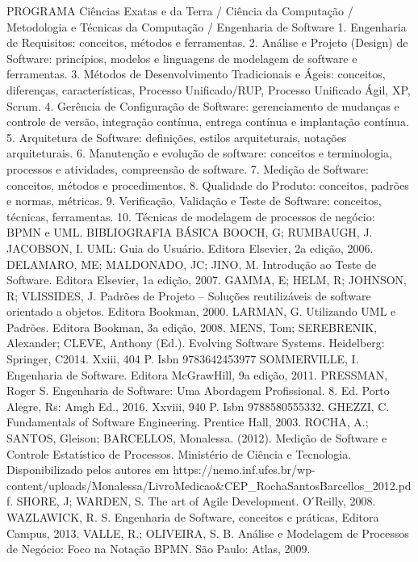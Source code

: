 
PROGRAMA
Ciências Exatas e da Terra / Ciência da Computação / Metodologia e Técnicas da Computação / Engenharia de Software
1. Engenharia de Requisitos: conceitos, métodos e ferramentas.
2. Análise e Projeto (Design) de Software: princípios, modelos e linguagens de modelagem de software e ferramentas.
3. Métodos de Desenvolvimento Tradicionais e Ágeis: conceitos, diferenças, características, Processo Unificado/RUP, Processo Unificado Ágil, XP, Scrum.
4. Gerência de Configuração de Software: gerenciamento de mudanças e controle de versão, integração contínua, entrega contínua e implantação contínua.
5. Arquitetura de Software: definições, estilos arquiteturais, notações arquiteturais.
6. Manutenção e evolução de software: conceitos e terminologia, processos e atividades, compreensão de software.
7. Medição de Software: conceitos, métodos e procedimentos.
8. Qualidade do Produto: conceitos, padrões e normas, métricas.
9. Verificação, Validação e Teste de Software: conceitos, técnicas, ferramentas.
10. Técnicas de modelagem de processos de negócio: BPMN e UML.
BIBLIOGRAFIA BÁSICA
BOOCH, G; RUMBAUGH, J. JACOBSON, I. UML: Guia do Usuário. Editora Elsevier, 2a edição, 2006.
DELAMARO, ME; MALDONADO, JC; JINO, M. Introdução ao Teste de Software. Editora Elsevier, 1a edição, 2007.
GAMMA, E; HELM, R; JOHNSON, R; VLISSIDES, J. Padrões de Projeto – Soluções reutilizáveis de software orientado a objetos. Editora Bookman, 2000. LARMAN, G. Utilizando UML e Padrões. Editora Bookman, 3a edição, 2008.
MENS, Tom; SEREBRENIK, Alexander; CLEVE, Anthony (Ed.). Evolving Software Systems. Heidelberg: Springer, C2014. Xxiii, 404 P. Isbn 9783642453977
SOMMERVILLE, I. Engenharia de Software. Editora McGrawHill, 9a edição, 2011.
PRESSMAN, Roger S. Engenharia de Software: Uma Abordagem Profissional. 8. Ed. Porto Alegre, Rs: Amgh Ed., 2016. Xxviii, 940 P. Isbn 9788580555332.
GHEZZI, C. Fundamentals of Software Engineering. Prentice Hall, 2003.
ROCHA, A.; SANTOS, Gleison; BARCELLOS, Monalessa. (2012). Medição de Software e Controle Estatístico de Processos. Ministério de Ciência e Tecnologia. Disponibilizado pelos autores em https://nemo.inf.ufes.br/wp-content/uploads/Monalessa/LivroMedicao&CEP_RochaSantosBarcellos_2012.pdf.
SHORE, J; WARDEN, S. The art of Agile Development. O ́Reilly, 2008.
WAZLAWICK, R. S. Engenharia de Software, conceitos e práticas, Editora Campus, 2013.
VALLE, R.; OLIVEIRA, S. B. Análise e Modelagem de Processos de Negócio: Foco na Notação BPMN. São Paulo: Atlas, 2009.


